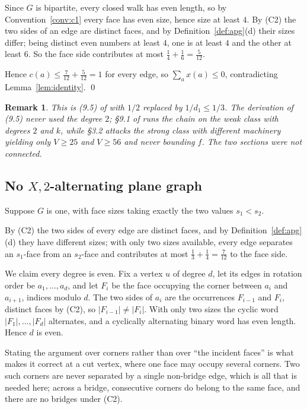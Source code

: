 \documentclass{baustms}
\theoremstyle{cupthm}
\theoremstyle{cupdefn}
\theoremstyle{cuprem}
\newtheorem{remark}[theorem]{Remark}
\begin{document}
Since $G$ is bipartite, every closed walk has even length, so by
Convention~\ref{conv:c1} every face has even size, hence size at least $4$. By
(C2) the two sides of an edge are distinct faces, and by
Definition~\ref{def:apg}(d) their sizes differ; being distinct even numbers at
least $4$, one is at least $4$ and the other at least $6$. So the face side
contributes at most $\tfrac14 + \tfrac16 = \tfrac{5}{12}$.

Hence $c(a) \le \tfrac{7}{12} + \tfrac{5}{12} = 1$ for every edge, so
$\sum_a x(a) \le 0$, contradicting Lemma~\ref{lem:identity}. \qed

\begin{remark}
This is (9.5) of \cite{AHSSV2015} with $1/2$ replaced by $1/d_1 \le 1/3$. The
derivation of (9.5) never used the degree $2$; \S9.1 of \cite{AHSSV2015} runs
the chain on the weak class with degrees $2$ and $k$, while \S3.2 attacks the
strong class with different machinery yielding only $V \ge 25$ and $V \ge 56$
and never bounding $f$. The two sections were not connected.
\end{remark}

\subsection{No $X,2$-alternating plane graph}\label{sec:halftwo}

Suppose $G$ is one, with face sizes taking exactly the two values $s_1 < s_2$.

By (C2) the two sides of every edge are distinct faces, and by
Definition~\ref{def:apg}(d) they have different sizes; with only two sizes
available, every edge separates an $s_1$-face from an $s_2$-face and contributes
at most $\tfrac13 + \tfrac14 = \tfrac{7}{12}$ to the face side.

We claim every degree is even. Fix a vertex $u$ of degree $d$, let its edges in
rotation order be $a_1,\dots,a_d$, and let $F_i$ be the face occupying the
corner between $a_i$ and $a_{i+1}$, indices modulo $d$. The two sides of $a_i$
are the occurrences $F_{i-1}$ and $F_i$, distinct faces by (C2), so
$|F_{i-1}| \ne |F_i|$. With only two sizes the cyclic word
$|F_1|,\dots,|F_d|$ alternates, and a cyclically alternating binary word has
even length. Hence $d$ is even.

Stating the argument over corners rather than over ``the incident faces'' is
what makes it correct at a cut vertex, where one face may occupy several
corners. Two such corners are never separated by a single non-bridge edge,
which is all that is needed here; across a bridge, consecutive corners do belong
to the same face, and there are no bridges under (C2).
\end{document}
